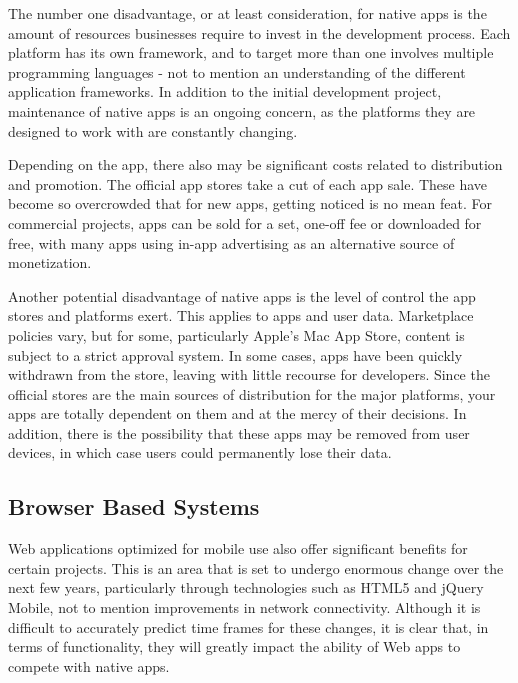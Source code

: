 The number one disadvantage, or at least consideration, for native apps is the amount of resources businesses require to invest in the development process. Each platform has its own framework, and to target more than one involves multiple programming languages - not to mention an understanding of the different application frameworks. In addition to the initial development project, maintenance of native apps is an ongoing concern, as the platforms they are designed to work with are constantly changing.

Depending on the app, there also may be significant costs related to distribution and promotion. The official app stores take a cut of each app sale. These have become so overcrowded that for new apps, getting noticed is no mean feat. For commercial projects, apps can be sold for a set, one-off fee or downloaded for free, with many apps using in-app advertising as an alternative source of monetization.

Another potential disadvantage of native apps is the level of control the app stores and platforms exert. This applies to apps and user data. Marketplace policies vary, but for some, particularly Apple's Mac App Store, content is subject to a strict approval system. In some cases, apps have been quickly withdrawn from the store, leaving with little recourse for developers. Since the official stores are the main sources of distribution for the major platforms, your apps are totally dependent on them and at the mercy of their decisions. In addition, there is the possibility that these apps may be removed from user devices, in which case users could permanently lose their data.








\subsection{Browser Based Systems}

Web applications optimized for mobile use also offer significant benefits for certain projects. This is an area that is set to undergo enormous change over the next few years, particularly through technologies such as HTML5 and jQuery Mobile, not to mention improvements in network connectivity. Although it is difficult to accurately predict time frames for these changes, it is clear that, in terms of functionality, they will greatly impact the ability of Web apps to compete with native apps.

